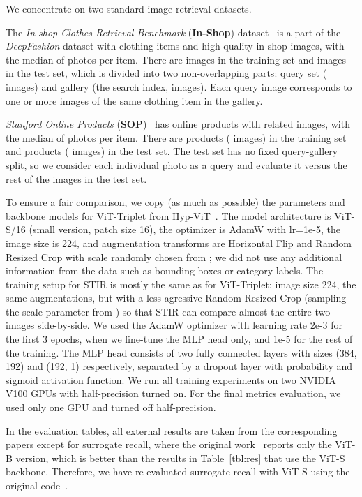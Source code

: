 \documentclass{article}
\begin{document}
We concentrate on two standard image retrieval datasets.

The \emph{In-shop Clothes Retrieval Benchmark} (\textbf{In-Shop}) dataset~\cite{liuLQWTcvpr16DeepFashion} is a part of the \emph{DeepFashion} dataset with  clothing items and  high quality in-shop images, with the median of  photos per item. There are  images in the training set and  images in the test set, which is divided into two non-overlapping parts: query set ( images) and gallery (the search index,  images). Each query image corresponds to one or more images of the same clothing item in the gallery. 


\emph{Stanford Online Products} (\textbf{SOP})~\cite{song2016deep} has  online products with  related images, with the median of  photos per item. There are  products ( images) in the training set and  products ( images) in the test set. The test set has no fixed query-gallery split, so we consider each individual photo as a query and evaluate it versus the rest of the images in the test set.

To ensure a fair comparison, we copy (as much as possible) the parameters and backbone models for ViT-Triplet from Hyp-ViT~\cite{9880306}. The model architecture is ViT-S/16 (small version, patch size 16), the optimizer is AdamW with lr=1e-5, the image size is 224, and augmentation transforms are Horizontal Flip and Random Resized Crop with scale randomly chosen from ; we did not use any additional information from the data such as bounding boxes or category labels.
The training setup for STIR is mostly the same as for ViT-Triplet: image size 224, the same augmentations, but with a less agressive Random Resized Crop (sampling the scale parameter from ) so that STIR can compare almost the entire two images side-by-side. We used the AdamW optimizer with learning rate 2e-3 for the first 3 epochs, when we fine-tune the MLP head only, and 1e-5 for the rest of the training. The MLP head consists of two fully connected layers with sizes (384, 192) and (192, 1) respectively, separated by a dropout layer with probability  and sigmoid activation function.
We run all training experiments on two NVIDIA V100 GPUs with half-precision turned on. For the final metrics evaluation, we used only one GPU and turned off half-precision.

In the evaluation tables, all external results are taken from the corresponding papers except for surrogate recall, where the original work~\cite{patel2022recall} reports only the ViT-B version, which is better than the results in Table~\ref{tbl:res} that use the ViT-S backbone. Therefore, we have re-evaluated surrogate recall with ViT-S using the original code~\cite{patel2022recall}.
\end{document}
